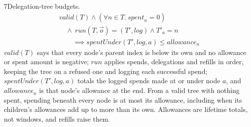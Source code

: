 \begin{perchstatement}{7}{Delegation-tree budgets.}\label{stmt:delegation-tree-budgets}
\[\begin{aligned}&\mathit{valid}(T) \land (\forall n \in T.\ \mathit{spent}_n = 0)\\
&\quad \land\ \mathit{run}(T, \vec o) = (T', \mathit{log}) \land T'_a = n\\
&\qquad \implies \mathit{spentUnder}(T', \mathit{log}, a) \le \mathit{allowance}_n\end{aligned}\]
\(\mathit{valid}(T)\) says that every node's parent index is below its own and no allowance or spent amount is negative; \(\mathit{run}\) applies spends, delegations and refills in order, keeping the tree on a refused one and logging each successful spend; \(\mathit{spentUnder}(T', \mathit{log}, a)\) totals the logged spends made at or under node \(a\), and \(\mathit{allowance}_n\) is that node's allowance at the end. From a valid tree with nothing spent, spending beneath every node is at most its allowance, including when its children's allowances add up to more than its own. Allowances are lifetime totals, not windows, and refills raise them.
\end{perchstatement}
